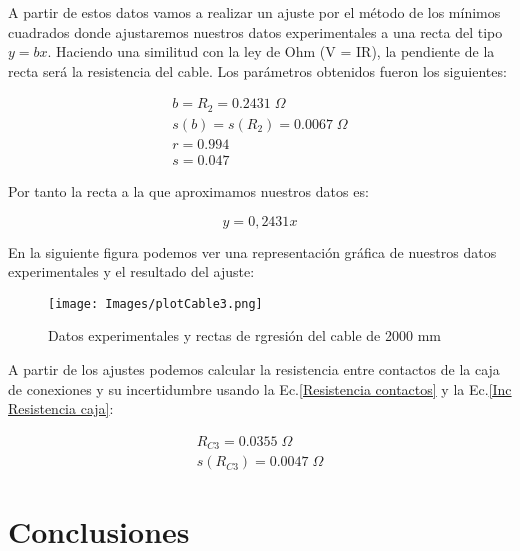 \documentclass[a4paper,12pt,titlepage]{article}
\begin{document}
\newpage

A partir de estos datos vamos a realizar un ajuste por el método de los mínimos cuadrados donde ajustaremos nuestros datos experimentales a una recta del tipo $y = bx$. Haciendo una similitud con la ley de Ohm (V = IR), la pendiente de la recta será la resistencia del cable. Los parámetros obtenidos fueron los siguientes:

\begin{equation}
    \begin{gathered}
        b = R_{2} = 0.2431 \; \Omega \\
        s(b) = s(R_{2}) = 0.0067\; \Omega \\
        r =    0.994 \\
        s =  0.047
    \end{gathered}
\end{equation}

Por tanto la recta a la que aproximamos nuestros datos es:

\begin{equation}
    y = 0,2431x
\end{equation}

En la siguiente figura podemos ver una representación gráfica de nuestros datos experimentales y el resultado del ajuste:

\begin{figure}[h!]
    \centering
    \texttt{[image: Images/plotCable3.png]}
    \caption{Datos experimentales y rectas de rgresión del cable de 2000 mm}
\end{figure}

\newpage

A partir de los ajustes podemos calcular la resistencia entre contactos de la caja de conexiones y su incertidumbre usando la Ec.\ref{Resistencia contactos} y la Ec.\ref{Inc Resistencia caja}:

\begin{equation}
    \begin{gathered}
        R_{C3} = 0.0355 \; \Omega\\
        s(R_{C3}) = 0.0047\; \Omega
    \end{gathered}
\end{equation}




\newpage

\section{Conclusiones}
\end{document}

